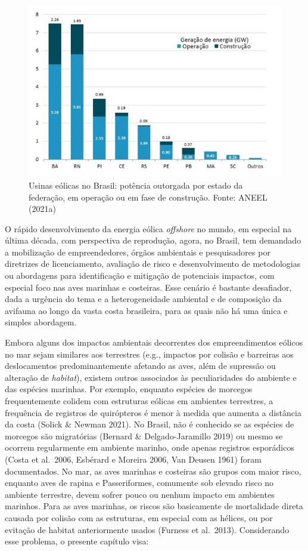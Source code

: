 \documentclass[
  oneside]{scrbook}
\begin{document}
\begin{figure}[H]

{\centering \includegraphics[width=0.65\linewidth]{imagens/cap08/Figura_8.3} 

}

\caption{Usinas eólicas no Brasil: potência outorgada por estado da federação, em operação ou em fase de construção. Fonte: ANEEL (2021a)}\label{fig:63}
\end{figure}

O rápido desenvolvimento da energia eólica \emph{offshore} no mundo, em especial na última década, com perspectiva de reprodução, agora, no Brasil, tem demandado a mobilização de empreendedores, órgãos ambientais e pesquisadores por diretrizes de licenciamento, avaliação de risco e desenvolvimento de metodologias ou abordagens para identificação e mitigação de potenciais impactos, com especial foco nas aves marinhas e costeiras. Esse cenário é bastante desafiador, dada a urgência do tema e a heterogeneidade ambiental e de composição da avifauna ao longo da vasta costa brasileira, para as quais não há uma única e simples abordagem.

Embora alguns dos impactos ambientais decorrentes dos empreendimentos eólicos no mar sejam similares aos terrestres (e.g., impactos por colisão e barreiras aos deslocamentos predominantemente afetando as aves, além de supressão ou alteração de \emph{habitat}), existem outros associados às peculiaridades do ambiente e das espécies marinhas. Por exemplo, enquanto espécies de morcegos frequentemente colidem com estruturas eólicas em ambientes terrestres, a frequência de registros de quirópteros é menor à medida que aumenta a distância da costa (Solick \& Newman 2021). No Brasil, não é conhecido se as espécies de morcegos são migratórias (Bernard \& Delgado-Jaramillo 2019) ou mesmo se ocorrem regularmente em ambiente marinho, onde apenas registros esporádicos (Costa et al.~2006, Esbérard e Moreira 2006, Van Deusen 1961) foram documentados. No mar, as aves marinhas e costeiras são grupos com maior risco, enquanto aves de rapina e Passeriformes, comumente sob elevado risco no ambiente terrestre, devem sofrer pouco ou nenhum impacto em ambientes marinhos. Para as aves marinhas, os riscos são basicamente de mortalidade direta causada por colisão com as estruturas, em especial com as hélices, ou por evitação de habitat anteriormente usados (Furness et al.~2013). Considerando esse problema, o presente capítulo visa:
\end{document}
